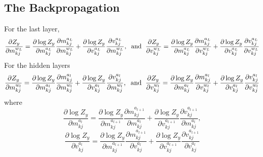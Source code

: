 \documentclass[]{article}
\begin{document}
\subsection{The Backpropagation}
For the last layer,
\begin{equation}
	\frac{\partial Z_y}{\partial m_{kj}^{w_L}} = \frac{\partial \log Z_y}{\partial m_{kj}^{a_L}}\frac{\partial m^{a_L}_{kj}}{\partial m_{kj}^{w_L}} + \frac{\partial \log Z_y}{\partial v_{kj}^{a_L}}\frac{\partial v^{a_L}_{kj}}{\partial m_{kj}^{w_L}}, \hspace{0.08in}\text{and} \hspace{0.08in}
	\frac{\partial Z_y}{\partial v_{kj}^{w_L}} = \frac{\partial \log Z_y}{\partial m_{kj}^{a_L}}\frac{\partial m^{a_L}_{kj}}{\partial v_{kj}^{w_L}} + \frac{\partial \log Z_y}{\partial v_{kj}^{a_L}}\frac{\partial v^{a_L}_{kj}}{\partial v_{kj}^{w_L}}
	\label{equ:64}
\end{equation}
For the hidden layers
\begin{equation}
	\frac{\partial Z_y}{\partial m_{kj}^{w_l}} = \frac{\partial \log Z_y}{\partial m_{kj}^{a_l}}\frac{\partial m^{a_l}_{kj}}{\partial m_{kj}^{w_l}} + \frac{\partial \log Z_y}{\partial v_{kj}^{a_l}}\frac{\partial v^{a_l}_{kj}}{\partial m_{kj}^{w_l}}, \hspace{0.08in} \text{and} \hspace{0.08in} \frac{\partial Z_y}{\partial v_{kj}^{w_l}} = \frac{\partial \log Z_y}{\partial m_{kj}^{a_l}}\frac{\partial m^{a_l}_{kj}}{\partial v_{kj}^{w_l}} + \frac{\partial \log Z_y}{\partial v_{kj}^{a_l}}\frac{\partial v^{a_{l}}_{kj}}{\partial v_{kj}^{w_l}}
	\label{equ:65}
\end{equation}
where
\begin{equation}
	\frac{\partial \log Z_y}{\partial m_{kj}^{a_l}} = \frac{\partial \log Z_y}{\partial m_{kj}^{a_{l+1}}} \frac{\partial m_{kj}^{a_{l+1}}}{\partial m_{kj}^{a_l}} + \frac{\partial \log Z_y}{\partial v_{kj}^{a_{l+1}}} \frac{\partial v_{kj}^{a_{l+1}}}{\partial m_{kj}^{a_l}}, %
	\label{equ:66}
\end{equation}
\begin{equation}
	\frac{\partial \log Z_y}{\partial v_{kj}^{a_l}} = \frac{\partial \log Z_y}{\partial m_{kj}^{a_{l+1}}} \frac{\partial m_{kj}^{a_{l+1}}}{\partial v_{kj}^{a_l}} + \frac{\partial \log Z_y}{\partial v_{kj}^{a_{l+1}}} \frac{\partial v_{kj}^{a_{l+1}}}{\partial v_{kj}^{a_l}}
	\label{equ:67}
\end{equation}
\end{document}
